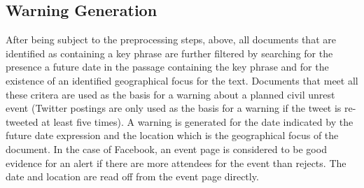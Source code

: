 %

%



\subsection{Warning Generation}
After being subject to the preprocessing steps, above, all documents
that are identified as containing a key phrase are further filtered by
searching for the presence a future date in the passage containing the
key phrase and for the existence of an identified geographical focus for the text.
Documents that meet all these critera are used as the basis for a warning about a
planned civil unrest event (Twitter postings are only used as the basis for a warning
if the tweet is re-tweeted at least five times). 
A warning is generated for the date indicated by the future date
expression and the location which is the geographical focus of the
document.  
In the case of Facebook, an event page is considered to be good evidence for an alert if
there are more attendees for the event than rejects.  The date and
location are read off from the event page directly.




